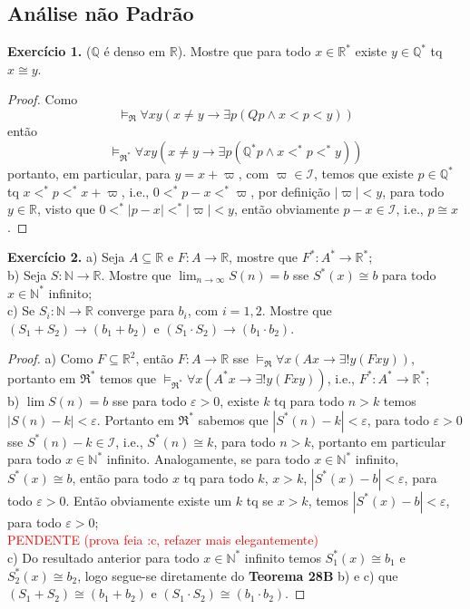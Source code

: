 \documentclass[11pt]{article}
\newcommand{\mc}[1]{\mathcal{#1}}
\newcommand{\mf}[1]{\mathfrak{#1}}
\newcommand{\mbb}[1]{\mathbb{#1}}
\newcommand{\subs}[2]{
    \setcounter{subsection}{#1 - 1}
    \subsection{#2}
    }
\begin{document}
\subs{8}{Análise não Padrão}

\begin{shaded}
\textbf{Exercício 1.} ($\mbb{Q}$ é denso em $\mbb{R}$). Mostre que para todo $x\in\mbb{R}^*$ existe $y\in\mbb{Q}^*$ tq $x\cong y$.
\end{shaded}

\begin{proof}
    Como
    $$\vDash_\mf{R}\forall xy(x\neq y\to\exists p(Qp\wedge x<p<y))$$
    então
    $$\vDash_{\mf{R}^*}\forall xy(x\neq y\to\exists p(\mbb{Q}^*p\wedge x<^*p<^*y))$$
    portanto, em particular, para $y=x+\varpi$, com $\varpi\in\mc{I}$, temos que existe $p\in\mbb{Q}^*$ tq $x<^*p<^*x+\varpi$, i.e., $0<^*p-x<^*\varpi$, por definição $|\varpi|<y$, para todo $y\in\mbb{R}$, visto que $0<^*|p-x|<^*|\varpi|<y$, então obviamente $p-x\in\mc{I}$, i.e., $p\cong x$.
\end{proof}

\begin{shaded}
\textbf{Exercício 2.} a) Seja $A\subseteq\mbb{R}$ e $F:A\to\mbb{R}$, mostre que $F^*:A^*\to\mbb{R}^*$;\\
b) Seja $S:\mbb{N}\to\mbb{R}$. Mostre que $\lim_{n\to\infty}S(n)=b$ sse $S^*(x)\cong b$ para todo $x\in\mbb{N}^*$ infinito;\\
c) Se $S_i:\mbb{N}\to\mbb{R}$ converge para $b_i$, com $i=1,2$. Mostre que $(S_1+S_2)\to(b_1+b_2)$ e $(S_1\cdot S_2)\to(b_1\cdot b_2)$.
\end{shaded}

\begin{proof}
    a) Como $F\subseteq\mbb{R}^2$, então $F:A\to\mbb{R}$ sse $\vDash_\mf{R}\forall x(Ax\to\exists!y(Fxy))$, portanto em $\mf{R}^*$ temos que $\vDash_{\mf{R}^*}\forall x(A^*x\to\exists!y(Fxy))$, i.e., $F^*:A^*\to\mbb{R}^*$;\\
    b) $\lim S(n)=b$ sse para todo $\varepsilon>0$, existe $k$ tq para todo $n>k$ temos $|S(n)-k|<\varepsilon$. Portanto em $\mf{R}^*$ sabemos que $|S^*(n)-k|<\varepsilon$, para todo $\varepsilon>0$ sse $S^*(n)-k\in\mc{I}$, i.e., $S^*(n)\cong k$, para todo $n>k$, portanto em particular para todo $x\in\mbb{N}^*$ infinito. Analogamente, se para todo $x\in\mbb{N}^*$ infinito, $S^*(x)\cong b$, então para todo $x$ tq para todo $k$, $x>k$, $|S^*(x)-b|<\varepsilon$, para todo $\varepsilon>0$. Então obviamente existe um $k$ tq se $x>k$, temos $|S^*(x)-b|<\varepsilon$, para todo $\varepsilon>0$;\\
    \textcolor{red}{PENDENTE (prova feia :c, refazer mais elegantemente)}\\
    c) Do resultado anterior para todo $x\in\mbb{N}^*$ infinito temos $S_1^*(x)\cong b_1$ e $S_2^*(x)\cong b_2$, logo segue-se diretamente do \textbf{Teorema 28B} b) e c) que $(S_1+S_2)\cong(b_1+b_2)$ e $(S_1\cdot S_2)\cong(b_1\cdot b_2)$.
\end{proof}
\end{document}
